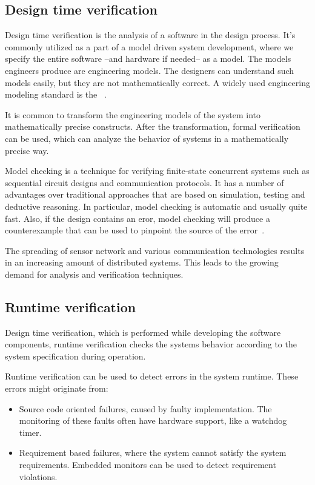 \subsection{Design time verification}

Design time verification is the analysis of a software in the design process. It's commonly utilized as a part of a model driven system development, where we specify the entire software --and hardware if needed-- as a model.
The models engineers produce are engineering models. The designers can understand such models easily, but they are not mathematically correct. A widely used engineering modeling standard is the \uml{}~\cite{UML}.

It is common to transform the engineering models of the system into mathematically precise constructs. After the transformation, formal verification can be used, which can analyze the behavior of systems in a mathematically precise way.

Model checking is a technique for verifying finite-state concurrent systems such as sequential circuit designs and communication protocols. It has a number of advantages over traditional approaches that are based on simulation, testing and deductive reasoning. In particular, model checking is automatic and usually quite fast. Also, if the design contains an eror, model checking will produce a counterexample that can be used to pinpoint the source of the error~\cite{mcmillan1993symbolic}.

The spreading of sensor network and various communication technologies results in an increasing amount of distributed systems. This leads to the growing demand for analysis and verification techniques.

\subsection{Runtime verification}

Design time verification, which is performed while developing the software components, runtime verification checks the systems behavior according to the system specification during operation.

Runtime verification can be used to detect errors in the system runtime. These errors might originate from:
\begin{itemize}
	\item Source code oriented failures, caused by faulty implementation. The monitoring of these faults often have hardware support, like a watchdog timer.
	\item Requirement based failures, where the system cannot satisfy the system requirements. Embedded monitors can be used to detect requirement violations.
\end{itemize}

